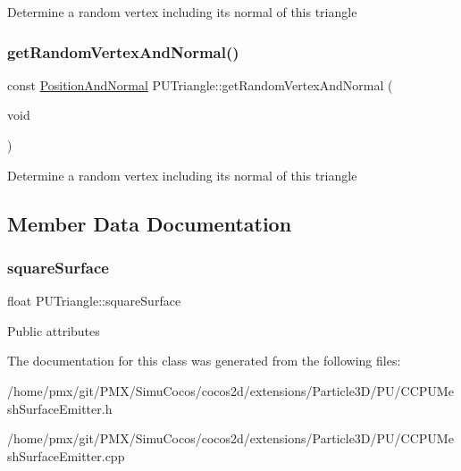 Determine a random vertex including its normal of this triangle \mbox{\label{classPUTriangle_a8458379215dcaf49c973ac9c0fa2bf27}} 
\subsubsection{\texorpdfstring{get\+Random\+Vertex\+And\+Normal()}{getRandomVertexAndNormal()}\hspace{0.1cm}{\footnotesize\ttfamily [2/2]}}
{\footnotesize\ttfamily const \hyperlink{structPUTriangle_1_1PositionAndNormal}{Position\+And\+Normal} P\+U\+Triangle\+::get\+Random\+Vertex\+And\+Normal (\begin{DoxyParamCaption}\item[{void}]{ }\end{DoxyParamCaption})}

Determine a random vertex including its normal of this triangle 

\subsection{Member Data Documentation}
\mbox{\label{classPUTriangle_ad3fb46e004638c2b4ad156e7371d3e10}} 
\subsubsection{\texorpdfstring{square\+Surface}{squareSurface}}
{\footnotesize\ttfamily float P\+U\+Triangle\+::square\+Surface}

Public attributes 

The documentation for this class was generated from the following files\+:\begin{DoxyCompactItemize}
\item 
/home/pmx/git/\+P\+M\+X/\+Simu\+Cocos/cocos2d/extensions/\+Particle3\+D/\+P\+U/C\+C\+P\+U\+Mesh\+Surface\+Emitter.\+h\item 
/home/pmx/git/\+P\+M\+X/\+Simu\+Cocos/cocos2d/extensions/\+Particle3\+D/\+P\+U/C\+C\+P\+U\+Mesh\+Surface\+Emitter.\+cpp\end{DoxyCompactItemize}
